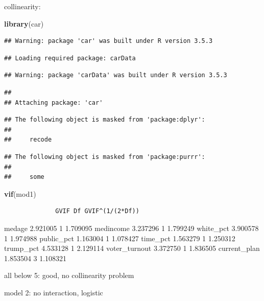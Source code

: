 \documentclass[
]{article}
\newenvironment{Shaded}{\begin{snugshade}}{\end{snugshade}}
\newcommand{\KeywordTok}[1]{\textcolor[rgb]{0.13,0.29,0.53}{\textbf{#1}}}
\newcommand{\NormalTok}[1]{#1}
\begin{document}
collinearity:

\begin{Shaded}
\begin{Highlighting}[]
\KeywordTok{library}\NormalTok{(car)}
\end{Highlighting}
\end{Shaded}

\begin{verbatim}
## Warning: package 'car' was built under R version 3.5.3
\end{verbatim}

\begin{verbatim}
## Loading required package: carData
\end{verbatim}

\begin{verbatim}
## Warning: package 'carData' was built under R version 3.5.3
\end{verbatim}

\begin{verbatim}
## 
## Attaching package: 'car'
\end{verbatim}

\begin{verbatim}
## The following object is masked from 'package:dplyr':
## 
##     recode
\end{verbatim}

\begin{verbatim}
## The following object is masked from 'package:purrr':
## 
##     some
\end{verbatim}

\begin{Shaded}
\begin{Highlighting}[]
\KeywordTok{vif}\NormalTok{(mod1)}
\end{Highlighting}
\end{Shaded}

\begin{verbatim}
              GVIF Df GVIF^(1/(2*Df))
\end{verbatim}

medage 2.921005 1 1.709095 medincome 3.237296 1 1.799249 white\_pct
3.900578 1 1.974988 public\_pct 1.163004 1 1.078427 time\_pct 1.563279 1
1.250312 trump\_pct 4.533128 1 2.129114 voter\_turnout 3.372750 1
1.836505 current\_plan 1.853504 3 1.108321

all below 5: good, no collinearity problem

model 2: no interaction, logistic
\end{document}
